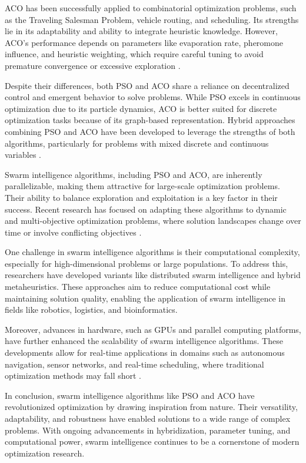 ACO has been successfully applied to combinatorial optimization problems, such as the Traveling Salesman Problem, vehicle routing, and scheduling. Its strengths lie in its adaptability and ability to integrate heuristic knowledge. However, ACO's performance depends on parameters like evaporation rate, pheromone influence, and heuristic weighting, which require careful tuning to avoid premature convergence or excessive exploration \parencite{blum2005ant}.

Despite their differences, both PSO and ACO share a reliance on decentralized control and emergent behavior to solve problems. While PSO excels in continuous optimization due to its particle dynamics, ACO is better suited for discrete optimization tasks because of its graph-based representation. Hybrid approaches combining PSO and ACO have been developed to leverage the strengths of both algorithms, particularly for problems with mixed discrete and continuous variables \parencite{talbi2009metaheuristics}.

Swarm intelligence algorithms, including PSO and ACO, are inherently parallelizable, making them attractive for large-scale optimization problems. Their ability to balance exploration and exploitation is a key factor in their success. Recent research has focused on adapting these algorithms to dynamic and multi-objective optimization problems, where solution landscapes change over time or involve conflicting objectives \parencite{coello2004handling}.

One challenge in swarm intelligence algorithms is their computational complexity, especially for high-dimensional problems or large populations. To address this, researchers have developed variants like distributed swarm intelligence and hybrid metaheuristics. These approaches aim to reduce computational cost while maintaining solution quality, enabling the application of swarm intelligence in fields like robotics, logistics, and bioinformatics.

Moreover, advances in hardware, such as GPUs and parallel computing platforms, have further enhanced the scalability of swarm intelligence algorithms. These developments allow for real-time applications in domains such as autonomous navigation, sensor networks, and real-time scheduling, where traditional optimization methods may fall short \parencite{yang2013swarm}.

In conclusion, swarm intelligence algorithms like PSO and ACO have revolutionized optimization by drawing inspiration from nature. Their versatility, adaptability, and robustness have enabled solutions to a wide range of complex problems. With ongoing advancements in hybridization, parameter tuning, and computational power, swarm intelligence continues to be a cornerstone of modern optimization research.



